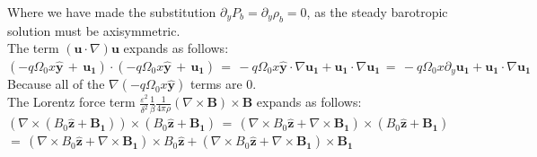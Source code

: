 \documentclass[letterpaper,12pt]{article}
\begin{document}
Where we have made the substitution $\partial_y P_b = \partial_y \rho_b = 0$, as the steady barotropic solution must be axisymmetric. \\

The term $\left(\mathbf{u} \cdot \nabla\right)\mathbf{u}$ expands as follows:\\

$\left(-q \Omega_0 x \mathbf{\hat{y}} \, + \, \mathbf{u_1}\right) \cdot \left(-q \Omega_0 x \mathbf{\hat{y}} \, + \, \mathbf{u_1}\right) \, = \, - q \Omega_0 x \mathbf{\hat{y}} \cdot \nabla \mathbf{u_1} + \mathbf{u_1} \cdot \nabla \mathbf{u_1} \, = \, - q \Omega_0 x \partial_y \mathbf{u_1} + \mathbf{u_1} \cdot \nabla \mathbf{u_1}$ \\

Because all of the $\nabla \left(-q \Omega_0 x \mathbf{\hat{y}}\right)$ terms are 0. \\






The Lorentz force term $\frac{\varepsilon^2}{\delta^2} \frac{1}{\beta} \frac{1}{4 \pi \rho} \left( \nabla \times \mathbf{B} \right) \times \mathbf{B}$ expands as follows: \\

$ \left( \nabla \times \left(B_0 \mathbf{\hat{z}} + \mathbf{B_1}\right) \right) \times \left(B_0 \mathbf{\hat{z}} + \mathbf{B_1}\right) \, = \, \left( \nabla \times B_0 \mathbf{\hat{z}} + \nabla \times \mathbf{B_1} \right) \times \left(B_0 \mathbf{\hat{z}} + \mathbf{B_1}\right) \, $ \\

$= \, \left( \nabla \times B_0 \mathbf{\hat{z}} + \nabla \times \mathbf{B_1} \right) \times B_0 \mathbf{\hat{z}} + \left( \nabla \times B_0 \mathbf{\hat{z}} + \nabla \times \mathbf{B_1} \right) \times \mathbf{B_1} \, $ \\
\end{document}
